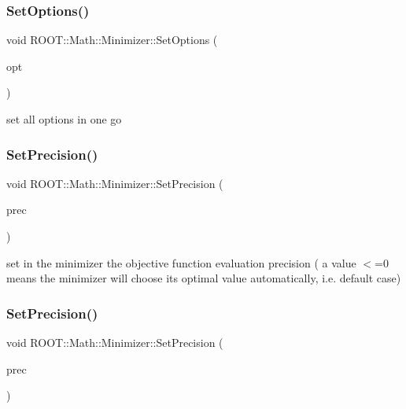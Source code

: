 \subsubsection{\texorpdfstring{SetOptions()}{SetOptions()}\hspace{0.1cm}{\footnotesize\ttfamily [3/3]}}
{\footnotesize\ttfamily void R\+O\+O\+T\+::\+Math\+::\+Minimizer\+::\+Set\+Options (\begin{DoxyParamCaption}\item[{const Minimizer\+Options \&}]{opt }\end{DoxyParamCaption})\hspace{0.3cm}{\ttfamily [inline]}}



set all options in one go 

\mbox{\label{classROOT_1_1Math_1_1Minimizer_a96160fe12f3cddf6ca0668ddb4a585bc}} 
\subsubsection{\texorpdfstring{SetPrecision()}{SetPrecision()}\hspace{0.1cm}{\footnotesize\ttfamily [1/3]}}
{\footnotesize\ttfamily void R\+O\+O\+T\+::\+Math\+::\+Minimizer\+::\+Set\+Precision (\begin{DoxyParamCaption}\item[{double}]{prec }\end{DoxyParamCaption})\hspace{0.3cm}{\ttfamily [inline]}}

set in the minimizer the objective function evaluation precision ( a value $<$=0 means the minimizer will choose its optimal value automatically, i.\+e. default case) \mbox{\label{classROOT_1_1Math_1_1Minimizer_a96160fe12f3cddf6ca0668ddb4a585bc}} 
\subsubsection{\texorpdfstring{SetPrecision()}{SetPrecision()}\hspace{0.1cm}{\footnotesize\ttfamily [2/3]}}
{\footnotesize\ttfamily void R\+O\+O\+T\+::\+Math\+::\+Minimizer\+::\+Set\+Precision (\begin{DoxyParamCaption}\item[{double}]{prec }\end{DoxyParamCaption})\hspace{0.3cm}{\ttfamily [inline]}}

